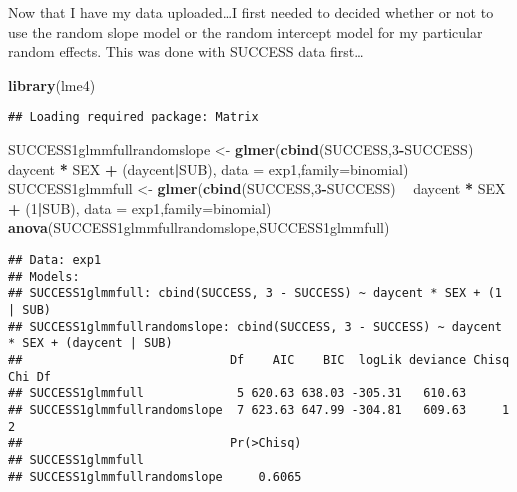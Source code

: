 \documentclass[]{article}
\newenvironment{Shaded}{\begin{snugshade}}{\end{snugshade}}
\newcommand{\KeywordTok}[1]{\textcolor[rgb]{0.13,0.29,0.53}{\textbf{#1}}}
\newcommand{\DataTypeTok}[1]{\textcolor[rgb]{0.13,0.29,0.53}{#1}}
\newcommand{\DecValTok}[1]{\textcolor[rgb]{0.00,0.00,0.81}{#1}}
\newcommand{\StringTok}[1]{\textcolor[rgb]{0.31,0.60,0.02}{#1}}
\newcommand{\OperatorTok}[1]{\textcolor[rgb]{0.81,0.36,0.00}{\textbf{#1}}}
\newcommand{\NormalTok}[1]{#1}
\begin{document}
Now that I have my data uploaded\ldots{}I first needed to decided
whether or not to use the random slope model or the random intercept
model for my particular random effects. This was done with SUCCESS data
first\ldots{}

\begin{Shaded}
\begin{Highlighting}[]
\KeywordTok{library}\NormalTok{(lme4)}
\end{Highlighting}
\end{Shaded}

\begin{verbatim}
## Loading required package: Matrix
\end{verbatim}

\begin{Shaded}
\begin{Highlighting}[]
\NormalTok{SUCCESS1glmmfullrandomslope <-}\StringTok{ }\KeywordTok{glmer}\NormalTok{(}\KeywordTok{cbind}\NormalTok{(SUCCESS,}\DecValTok{3}\OperatorTok{-}\NormalTok{SUCCESS) }\OperatorTok{~}\StringTok{ }\NormalTok{daycent }\OperatorTok{*}\StringTok{ }\NormalTok{SEX }\OperatorTok{+}\StringTok{ }\NormalTok{(daycent}\OperatorTok{|}\NormalTok{SUB), }\DataTypeTok{data =}\NormalTok{ exp1,}\DataTypeTok{family=}\NormalTok{binomial)}
\NormalTok{SUCCESS1glmmfull <-}\StringTok{ }\KeywordTok{glmer}\NormalTok{(}\KeywordTok{cbind}\NormalTok{(SUCCESS,}\DecValTok{3}\OperatorTok{-}\NormalTok{SUCCESS) }\OperatorTok{~}\StringTok{ }\NormalTok{daycent }\OperatorTok{*}\StringTok{ }\NormalTok{SEX }\OperatorTok{+}\StringTok{ }\NormalTok{(}\DecValTok{1}\OperatorTok{|}\NormalTok{SUB), }\DataTypeTok{data =}\NormalTok{ exp1,}\DataTypeTok{family=}\NormalTok{binomial)}
\KeywordTok{anova}\NormalTok{(SUCCESS1glmmfullrandomslope,SUCCESS1glmmfull)}
\end{Highlighting}
\end{Shaded}

\begin{verbatim}
## Data: exp1
## Models:
## SUCCESS1glmmfull: cbind(SUCCESS, 3 - SUCCESS) ~ daycent * SEX + (1 | SUB)
## SUCCESS1glmmfullrandomslope: cbind(SUCCESS, 3 - SUCCESS) ~ daycent * SEX + (daycent | SUB)
##                             Df    AIC    BIC  logLik deviance Chisq Chi Df
## SUCCESS1glmmfull             5 620.63 638.03 -305.31   610.63             
## SUCCESS1glmmfullrandomslope  7 623.63 647.99 -304.81   609.63     1      2
##                             Pr(>Chisq)
## SUCCESS1glmmfull                      
## SUCCESS1glmmfullrandomslope     0.6065
\end{verbatim}
\end{document}
